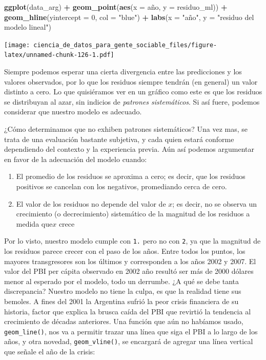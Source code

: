\documentclass[spanish,]{book}
\newenvironment{Shaded}{\begin{snugshade}}{\end{snugshade}}
\newcommand{\DataTypeTok}[1]{\textcolor[rgb]{0.13,0.29,0.53}{#1}}
\newcommand{\DecValTok}[1]{\textcolor[rgb]{0.00,0.00,0.81}{#1}}
\newcommand{\KeywordTok}[1]{\textcolor[rgb]{0.13,0.29,0.53}{\textbf{#1}}}
\newcommand{\NormalTok}[1]{#1}
\newcommand{\OperatorTok}[1]{\textcolor[rgb]{0.81,0.36,0.00}{\textbf{#1}}}
\newcommand{\StringTok}[1]{\textcolor[rgb]{0.31,0.60,0.02}{#1}}
\providecommand{\tightlist}{%
  \setlength{\itemsep}{0pt}\setlength{\parskip}{0pt}}
\begin{document}
\begin{Shaded}
\begin{Highlighting}[]
\KeywordTok{ggplot}\NormalTok{(data_arg) }\OperatorTok{+}
\StringTok{    }\KeywordTok{geom_point}\NormalTok{(}\KeywordTok{aes}\NormalTok{(}\DataTypeTok{x =}\NormalTok{ año, }\DataTypeTok{y =}\NormalTok{ residuo_ml)) }\OperatorTok{+}
\StringTok{    }\KeywordTok{geom_hline}\NormalTok{(}\DataTypeTok{yintercept =} \DecValTok{0}\NormalTok{, }\DataTypeTok{col =} \StringTok{"blue"}\NormalTok{) }\OperatorTok{+}
\StringTok{    }\KeywordTok{labs}\NormalTok{(}\DataTypeTok{x =} \StringTok{"año"}\NormalTok{, }\DataTypeTok{y =} \StringTok{"residuo del modelo lineal"}\NormalTok{)}
\end{Highlighting}
\end{Shaded}

\texttt{[image: ciencia\_de\_datos\_para\_gente\_sociable\_files/figure-latex/unnamed-chunk-126-1.pdf]}

Siempre podemos esperar una cierta divergencia entre las predicciones y los valores observados, por lo que los residuos siempre tendrán (en general) un valor distinto a cero. Lo que quisiéramos ver en un gráfico como este es que los residuos se distribuyan al azar, sin indicios de \emph{patrones sistemáticos}. Si así fuere, podemos considerar que nuestro modelo es adecuado.

¿Cómo determinamos que no exhiben patrones sistemáticos? Una vez mas, se trata de una evaluación bastante subjetiva, y cada quien estará conforme dependiendo del contexto y la experiencia previa. Aún así podemos argumentar en favor de la adecuación del modelo cuando:

\begin{enumerate}
\def\labelenumi{\arabic{enumi}.}
\tightlist
\item
  El promedio de los residuos se aproxima a cero; es decir, que los residuos positivos se cancelan con los negativos, promediando cerca de cero.
\item
  El valor de los residuos no depende del valor de \(x\); es decir, no se observa un crecimiento (o decrecimiento) sistemático de la magnitud de los residuos a medida que\(x\) crece
\end{enumerate}

Por lo visto, nuestro modelo cumple con \texttt{1.} pero no con \texttt{2}, ya que la magnitud de los residuos parece crecer con el paso de los años. Entre todos los puntos, los mayores transgresores son los últimos y corresponden a los años 2002 y 2007. El valor del PBI per cápita observado en 2002 año resultó ser más de 2000 dólares menor al esperado por el modelo, todo un derrumbe. ¿A qué se debe tanta discrepancia? Nuestro modelo no tiene la culpa, es que la realidad tiene sus bemoles. A fines del 2001 la Argentina sufrió la peor crisis financiera de su historia, factor que explica la brusca caída del PBI que revirtió la tendencia al crecimiento de décadas anteriores. Una función que aún no habíamos usado, \texttt{geom\_line()}, nos va a permitir trazar una línea que siga el PBI a lo largo de los años, y otra novedad, \texttt{geom\_vline()}, se encargará de agregar una línea vertical que señale el año de la crisis:
\end{document}
